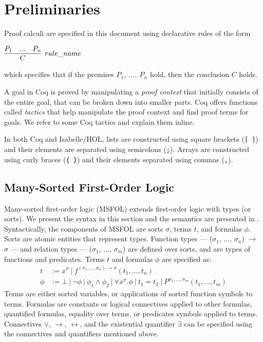 \documentclass[11pt]{article}
\begin{document}
	\section{Preliminaries}
	\label{sec:prelims}
	Proof calculi are specified in this 
	document using declarative rules of 
	the form
	\begin{center}
		$\infer[rule\_name]{C}{P_1 & ... & P_n}$
	\end{center}
	which specifies that if the premises 
	$P_1,\ \ldots,\ P_n$ hold, then the conclusion $C$
	holds.
	
	A goal in Coq is proved by 
	manipulating a \emph{proof 
	context} that initially consists 
	of the entire goal, that can be 
	broken down into smaller parts. 
	Coq offers functions called 
	\textit{tactics} that help manipulate 
	the proof context and find proof 
	terms for goals. We refer
	to some Coq tactics and 
	explain them inline.
	
	In both Coq and Isabelle/HOL,
	lists are constructed using 
	square brackets (\texttt{[ ]})
	and their elements are separated 
	using semicolons (\texttt{;}). 
	Arrays are constructed using 
	curly braces (\texttt{\{ \}})
	and their elements separated 
	using commas (\texttt{,}). 
	
	\subsection{Many-Sorted First-Order Logic}
	\label{sec:msfol}
	Many-sorted first-order logic (MSFOL)
	extends first-order logic with 
	types (or sorts). We present the 
	syntax in this section and the 
	semantics are presented in
	\cite{Barrett2018}. Syntactically, 
	the components of MSFOL are sorts 
	$\sigma$, terms $t$, and 
	formulas $\phi$. Sorts are 
	atomic entities that 
	represent types. Function types 
	--- ($\sigma_1$, ..., $\sigma_n$) 
	$\to$ $\sigma$ ---
	and relation types 
	--- ($\sigma_1$, ..., $\sigma_m$)
	are defined over sorts, and 
	are types of functions and 
	predicates. Terms $t$ and 
	formulas $\phi$ are specified as:
	\begin{align*}
	t &:= x^{\sigma}\ |\ 
	f^{(\sigma_1, ..., \sigma_n) \to 
		\sigma}	(t_1, ..., t_n)\\
	\phi &:= \bot\ |\ \neg \phi\ |\ 
	\phi_1 \land \phi_2\ |\ \forall 
	x^{\sigma} . \phi\ |\ t_1 = t_2
	\ |\ P^{\sigma_1,...,\sigma_m}
	(t_1, ..., t_m)
	\end{align*}
	Terms are either sorted variables, 
	or applications of sorted function
	symbols to terms.
	Formulas are constants or logical 
	connectives applied to other 
	formulas, quantified formulas, 
	equality over terms, or predicates
	symbols applied to terms. Connectives 
	$\lor$, 
	$\to$, $\leftrightarrow$, and the 
	existential	quantifier $\exists$ 
	can be specified using the connectives 
	and quantifiers mentioned above.
	
\end{document}
